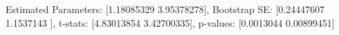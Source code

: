 Estimated Parameters: [1.18085329 3.95378278], Bootstrap SE: [0.24447607 1.1537143 ], t-stats: [4.83013854 3.42700335], p-values: [0.0013044  0.00899451]
